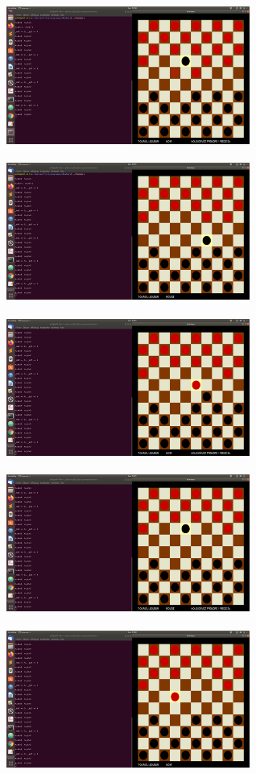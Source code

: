 \documentclass[a4paper]{article}
\begin{document}
\includegraphics[width = 8cm, height = 5cm]{premiertour5.png}
\bigbreak
\includegraphics[width = 8cm, height = 5cm]{premiertour6.png}
\includegraphics[width = 8cm, height = 5cm]{premiertour7.png}
\bigbreak
\includegraphics[width = 8cm, height = 5cm]{premiertour8.png}
\includegraphics[width = 8cm, height = 5cm]{premiertour9.png}
\bigbreak
\end{document}
